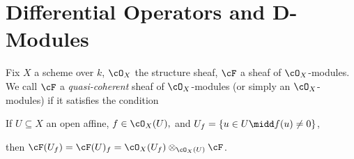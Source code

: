 \newpage
\section{Differential Operators and D-Modules}
\begin{defn}\label{defn:quasi-coh-Bernstein}
	Fix $X$ a scheme over $k$, $\cO_X$ the structure sheaf, $\cF$ a sheaf of $\cO_X$-modules. We call $\cF$ a \textit{quasi-coherent} sheaf of $\cO_X$-modules (or simply an $\cO_X$-modules) if it satisfies the condition
	\begin{center}
		If $U\subseteq X$ an open affine, $f \in \cO_X(U),$ and $U_f = \left\{u \in U \midd f(u) \neq 0\right\}$,
	\end{center}
	then $\cF(U_f) = \cF(U)_f = \cO_X(U_f)\otimes_{\cO_X(U)} \cF$.
\end{defn}

